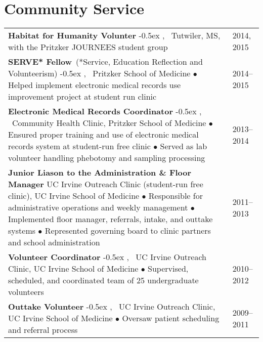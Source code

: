 \documentclass[letterpaper]{article}
\newcommand{\newlineb}                 %
    {
      \newline 
      \small                           %
      \hspace{0.30cm}                  %
      $\bullet$                        %
      }
\newcommand{\newlinea}{\kern-0.5ex , \ } %
\begin{document}
\section*{Community Service \hrulefill}
\begin{tabular}{L{14.5 cm}R{2.0 cm}}

\textbf{Habitat for Humanity Volunter}
  \newlinea Tutwiler, MS, with the Pritzker JOURNEES student group
& 2014, 2015\\
  
\textbf{SERVE* Fellow}{\small\ (*Service, Education Reflection and Volunteerism)}
  \newlinea Pritzker School of Medicine
  {\newlineb Helped implement electronic medical records use improvement project at student run clinic }
& 2014--2015 \\

\textbf{Electronic Medical Records Coordinator}
  \newlinea Community Health Clinic, Pritzker School of Medicine
  {\newlineb Ensured proper training and use of electronic medical records system at student-run free clinic}
  {\newlineb Served as lab volunteer handling phebotomy and sampling processing }
& 2013--2014 \\

\textbf{Junior Liason to the Administration \& Floor Manager}
  \newline UC Irvine Outreach Clinic (student-run free clinic), UC Irvine School of Medicine
  {\newlineb Responsible for administrative operations and weekly management}
  {\newlineb Implemented floor manager, referrals, intake, and outtake systems}
  {\newlineb Represented governing board to clinic partners and school administration}
& 2011--2013 \\

\textbf{Volunteer Coordinator}
  \newlinea UC Irvine Outreach Clinic, UC Irvine School of Medicine
  {\newlineb Supervised, scheduled, and coordinated team of 25 undergraduate volunteers}
& 2010--2012 \\

\textbf{Outtake Volunteer}
  \newlinea UC Irvine Outreach Clinic, UC Irvine School of Medicine
  {\newlineb Oversaw patient scheduling and referral process}
& 2009--2011 \\
  


\end{tabular}
\end{document}
